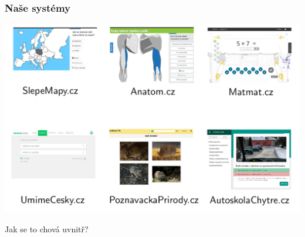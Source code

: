 \documentclass[xcolor=svgnames]{beamer}
\begin{document}
\begin{frame}
	\frametitle{Naše systémy}
   \includegraphics[width=\textwidth]{img/system-grid}
\end{frame}
\begin{frame}
	\begin{center}
		\Huge{Jak se to chová uvnitř?}
	\end{center}
\end{frame}
\end{document}
